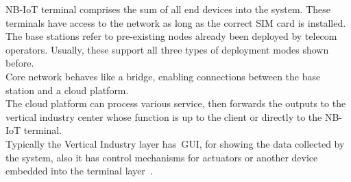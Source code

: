 NB-IoT terminal comprises the sum of all end devices into the system. These terminals have access to the network as long as the correct SIM card is installed.\\The base stations refer to pre-existing nodes already been deployed by telecom operators. Usually, these support all three types of deployment modes shown before.\\Core network behaves like a bridge, enabling connections between the base station and a cloud platform.\\The cloud platform can process various service, then forwards the  outputs to the vertical industry center whose function is up to the client or directly to the NB-IoT terminal.\\ Typically the Vertical Industry layer has~\gls{GUI}, for showing the data collected by the system, also it has control mechanisms for actuators or another device embedded into the terminal layer~\cite{Chen2017}.



